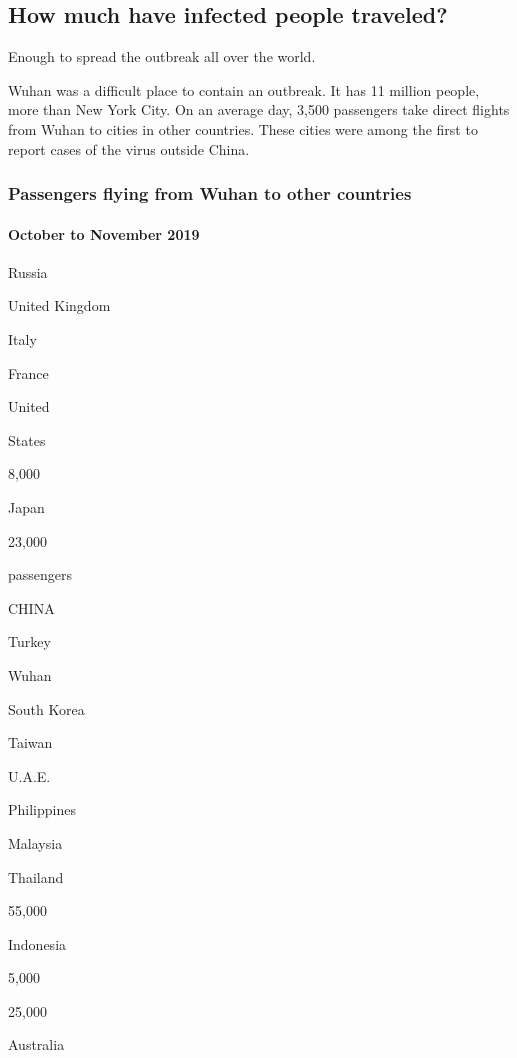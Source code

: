 \hypertarget{how-much-have-infected-people-traveled}{%
\subsection{How much have infected people
traveled?}\label{how-much-have-infected-people-traveled}}

Enough to spread the outbreak all over the world.

Wuhan was a difficult place to contain an outbreak. It has 11 million
people, more than New York City. On an average day, 3,500 passengers
take direct flights from Wuhan to cities in other countries. These
cities were among the first to report cases of the virus outside China.

\hypertarget{passengers-flying-from-wuhan-to-other-countries}{%
\subsubsection{Passengers flying from Wuhan to other
countries}\label{passengers-flying-from-wuhan-to-other-countries}}

\hypertarget{october-to-november-2019}{%
\paragraph{October to November 2019}\label{october-to-november-2019}}

Russia

United Kingdom

Italy

France

United

States

8,000

Japan

23,000

passengers

CHINA

Turkey

Wuhan

South Korea

Taiwan

U.A.E.

Philippines

Malaysia

Thailand

55,000

Indonesia

5,000

25,000

Australia

